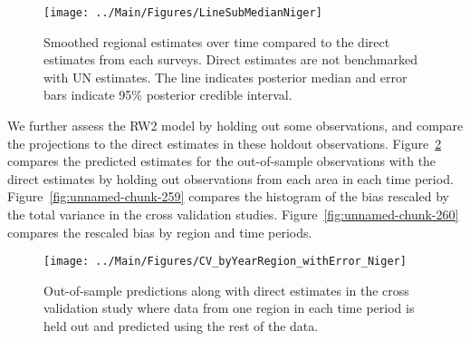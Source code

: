 \documentclass[12pt]{article}\usepackage[]{graphicx}\usepackage[]{color}
\newenvironment{knitrout}{}{} %
\begin{document}
\begin{knitrout}
\color{fgcolor}\begin{figure}[bht]

{\centering \texttt{[image: ../Main/Figures/LineSubMedianNiger]} 

}

\caption[Smoothed regional estimates over time compared to the direct estimates from each surveys]{Smoothed regional estimates over time compared to the direct estimates from each surveys. Direct estimates are not benchmarked with UN estimates. The line indicates posterior median and error bars indicate 95\% posterior credible interval.}\label{fig:unnamed-chunk-257}
\end{figure}


\end{knitrout}
We further assess the RW2 model by holding out some observations, and compare the projections to the direct estimates in these holdout observations. Figure~\ref{fig:unnamed-chunk-258} compares the predicted estimates for the out-of-sample observations  with the direct estimates by holding out observations from each area in each time period.  Figure~\ref{fig:unnamed-chunk-259} compares the histogram of the bias rescaled by the total variance in the cross validation studies. Figure~\ref{fig:unnamed-chunk-260} compares the rescaled bias by region and time periods.



 
\begin{knitrout}
\color{fgcolor}\begin{figure}[bht]

{\centering \texttt{[image: ../Main/Figures/CV\_byYearRegion\_withError\_Niger]} 

}

\caption[Out-of-sample predictions along with direct estimates in the cross validation study where data from one region in each time period is held out and predicted using the rest of the data]{Out-of-sample predictions along with direct estimates in the cross validation study where data from one region in each time period is held out and predicted using the rest of the data.}\label{fig:unnamed-chunk-258}
\end{figure}


\end{knitrout}
\end{document}
